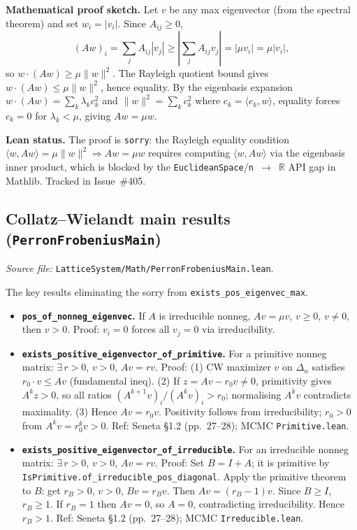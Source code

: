 \documentclass[a4paper,11pt]{article}
\begin{document}
\textbf{Mathematical proof sketch.}
Let $v$ be any max eigenvector (from the spectral theorem) and set $w_i = |v_i|$.
Since $A_{ij} \geq 0$,
\[
  (Aw)_i = \sum_j A_{ij}|v_j| \geq \left|\sum_j A_{ij}v_j\right| = |\mu v_i| = \mu|v_i|,
\]
so $w \cdot (Aw) \geq \mu\|w\|^2$.
The Rayleigh quotient bound gives $w \cdot (Aw) \leq \mu\|w\|^2$, hence equality.
By the eigenbasis expansion $w \cdot (Aw) = \sum_k \lambda_k c_k^2$ and
$\|w\|^2 = \sum_k c_k^2$ where $c_k = \langle e_k, w\rangle$,
equality forces $c_k = 0$ for $\lambda_k < \mu$, giving $Aw = \mu w$.

\textbf{Lean status.}
The proof is \texttt{sorry}: the Rayleigh equality condition
$\langle w, Aw\rangle = \mu\|w\|^2 \Rightarrow Aw = \mu w$
requires computing $\langle w, Aw\rangle$ via the eigenbasis inner product,
which is blocked by the \texttt{EuclideanSpace}/\texttt{n $\to$ $\mathbb{R}$} API gap in Mathlib.
Tracked in Issue~\#405.

\subsection{Collatz--Wielandt main results (\texttt{PerronFrobeniusMain})}
\label{sec:pf-main}

\emph{Source file:} \texttt{LatticeSystem/Math/PerronFrobeniusMain.lean}.

\medskip
The key results eliminating the sorry from \texttt{exists\_pos\_eigenvec\_max}.

\begin{itemize}
\item \textbf{\texttt{pos\_of\_nonneg\_eigenvec}.}
  If $A$ is irreducible nonneg, $Av = \mu v$, $v \geq 0$, $v \neq 0$, then $v > 0$.
  Proof: $v_i = 0$ forces all $v_j = 0$ via irreducibility.

\item \textbf{\texttt{exists\_positive\_eigenvector\_of\_primitive}.}
  For a primitive nonneg matrix: $\exists\,r>0$, $v>0$, $Av = rv$.
  Proof: (1) CW maximizer $v$ on $\Delta_n$ satisfies $r_0 \cdot v \leq Av$ (fundamental ineq).
  (2) If $z = Av - r_0 v \neq 0$, primitivity gives $A^k z > 0$, so all ratios
  $(A^{k+1}v)_i/(A^k v)_i > r_0$; normalising $A^k v$ contradicts maximality.
  (3) Hence $Av = r_0 v$. Positivity follows from irreducibility; $r_0 > 0$
  from $A^k v = r_0^k v > 0$.
  Ref: Seneta \S1.2 (pp.~27--28); MCMC \texttt{Primitive.lean}.

\item \textbf{\texttt{exists\_positive\_eigenvector\_of\_irreducible}.}
  For an irreducible nonneg matrix: $\exists\,r>0$, $v>0$, $Av = rv$.
  Proof: Set $B = I + A$; it is primitive by \texttt{IsPrimitive.of\_irreducible\_pos\_diagonal}.
  Apply the primitive theorem to $B$: get $r_B > 0$, $v > 0$, $Bv = r_B v$.
  Then $Av = (r_B-1)v$. Since $B \geq I$, $r_B \geq 1$.
  If $r_B = 1$ then $Av = 0$, so $A = 0$, contradicting irreducibility.
  Hence $r_B > 1$.
  Ref: Seneta \S1.2 (pp.~27--28); MCMC \texttt{Irreducible.lean}.
\end{itemize}
\end{document}
